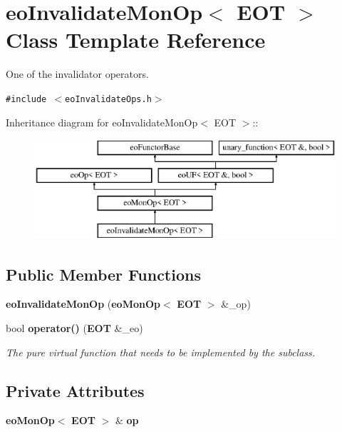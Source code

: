 \section{eo\-Invalidate\-Mon\-Op$<$ EOT $>$ Class Template Reference}
\label{classeo_invalidate_mon_op}
One of the invalidator operators.  


{\tt \#include $<$eo\-Invalidate\-Ops.h$>$}

Inheritance diagram for eo\-Invalidate\-Mon\-Op$<$ EOT $>$::\begin{figure}[H]
\begin{center}
\leavevmode
\includegraphics[height=3.71476cm]{classeo_invalidate_mon_op}
\end{center}
\end{figure}
\subsection*{Public Member Functions}
\begin{CompactItemize}
\item 
{\bf eo\-Invalidate\-Mon\-Op} ({\bf eo\-Mon\-Op}$<$ {\bf EOT} $>$ \&\_\-op)\label{classeo_invalidate_mon_op_a0}

\item 
bool {\bf operator()} ({\bf EOT} \&\_\-eo)\label{classeo_invalidate_mon_op_a1}

\begin{CompactList}\small\item\em The pure virtual function that needs to be implemented by the subclass. \item\end{CompactList}\end{CompactItemize}
\subsection*{Private Attributes}
\begin{CompactItemize}
\item 
{\bf eo\-Mon\-Op}$<$ {\bf EOT} $>$ \& {\bf op}\label{classeo_invalidate_mon_op_r0}

\end{CompactItemize}


